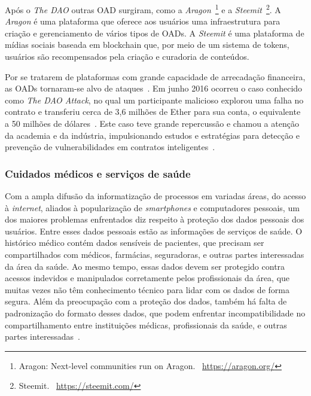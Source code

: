 Após o \textit{The DAO} outras OAD surgiram, como a \textit{Aragon}~\footnote{Aragon: Next-level communities run on Aragon. ~\url{https://aragon.org/}} e a \textit{Steemit}~\footnote{Steemit. ~\url{https://steemit.com/}}. A \textit{Aragon} é uma plataforma que oferece aos usuários uma infraestrutura para criação e gerenciamento de vários tipos de OADs. A \textit{Steemit} é uma plataforma de mídias sociais baseada em blockchain que, por meio de um sistema de tokens, usuários são recompensados pela criação e curadoria de conteúdos.  

Por se tratarem de plataformas com grande capacidade de arrecadação financeira, as OADs tornaram-se alvo de ataques~\cite{atzei2017survey-attacks-sok}. Em junho 2016 ocorreu o caso conhecido como \textit{The DAO Attack}, no qual um participante malicioso explorou uma falha no contrato e transferiu cerca de 3,6 milhões de Ether para sua conta, o equivalente a 50 milhões de dólares~\cite{siegel-dao-attack}. Este caso teve grande repercussão e chamou a atenção da academia e da indústria, impulsionando estudos e estratégias para detecção e prevenção de vulnerabilidades em contratos inteligentes~\cite{chen2020survey-ethereum-acm, liu2019survey-ieeeaccess}.

\subsubsection{Cuidados médicos e serviços de saúde} \label{tex:fund:ethereum:app:health}

Com a ampla difusão da informatização de processos em variadas áreas, do acesso à \textit{internet}, aliados à popularização de \textit{smartphones} e computadores pessoais, um dos maiores problemas enfrentados diz respeito à proteção dos dados pessoais dos usuários. Entre esses dados pessoais estão as informações de serviços de saúde. O histórico médico contém dados sensíveis de pacientes, que precisam ser compartilhados com médicos, farmácias, seguradoras, e outras partes interessadas da área da saúde. Ao mesmo tempo, essas dados devem ser protegido contra acessos indevidos e manipulados corretamente pelos profissionais da área, que muitas vezes não têm conhecimento técnico para lidar com os dados de forma segura.  Além da preocupação com a proteção dos dados, também há falta de padronização do formato desses dados, que podem enfrentar incompatibilidade no compartilhamento entre instituições médicas, profissionais da saúde, e outras partes interessadas~\cite{maesa2020blockchain3.0}.

